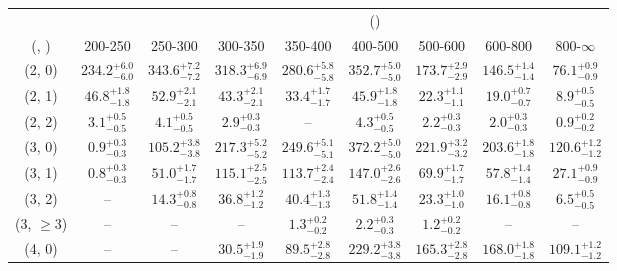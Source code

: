 \begin{table}[h!]
\tiny
\centering
{}
\begin{tabular}
{ccccccccc}
	\hline\hline
&	& \multicolumn{8}{c}{\scalht (\gev)} \\ 
	 (\njet,  \nb) & 200-250 & 250-300 & 300-350 & 350-400 & 400-500 & 500-600 & 600-800 & 800-$\infty$ \\ [0.8ex] 
\hline
	(2, 0) & $234.2^{+ 6.0 }_{- 6.0 }$ & $343.6^{+ 7.2 }_{- 7.2 }$ & $318.3^{+ 6.9 }_{- 6.9 }$ & $280.6^{+ 5.8 }_{- 5.8 }$ & $352.7^{+ 5.0 }_{- 5.0 }$ & $173.7^{+ 2.9 }_{- 2.9 }$ & $146.5^{+ 1.4 }_{- 1.4 }$ & $76.1^{+ 0.9 }_{- 0.9 }$ \\[0.5ex] 
	(2, 1) & $46.8^{+ 1.8 }_{- 1.8 }$ & $52.9^{+ 2.1 }_{- 2.1 }$ & $43.3^{+ 2.1 }_{- 2.1 }$ & $33.4^{+ 1.7 }_{- 1.7 }$ & $45.9^{+ 1.8 }_{- 1.8 }$ & $22.3^{+ 1.1 }_{- 1.1 }$ & $19.0^{+ 0.7 }_{- 0.7 }$ & $8.9^{+ 0.5 }_{- 0.5 }$ \\[0.5ex] 
	(2, 2) & $3.1^{+ 0.5 }_{- 0.5 }$ & $4.1^{+ 0.5 }_{- 0.5 }$ & $2.9^{+ 0.3 }_{- 0.3 }$ & -- & $4.3^{+ 0.5 }_{- 0.5 }$ & $2.2^{+ 0.3 }_{- 0.3 }$ & $2.0^{+ 0.3 }_{- 0.3 }$ & $0.9^{+ 0.2 }_{- 0.2 }$ \\[0.5ex] 
	(3, 0) & $0.9^{+ 0.3 }_{- 0.3 }$ & $105.2^{+ 3.8 }_{- 3.8 }$ & $217.3^{+ 5.2 }_{- 5.2 }$ & $249.6^{+ 5.1 }_{- 5.1 }$ & $372.2^{+ 5.0 }_{- 5.0 }$ & $221.9^{+ 3.2 }_{- 3.2 }$ & $203.6^{+ 1.8 }_{- 1.8 }$ & $120.6^{+ 1.2 }_{- 1.2 }$ \\[0.5ex] 
	(3, 1) & $0.8^{+ 0.3 }_{- 0.3 }$ & $51.0^{+ 1.7 }_{- 1.7 }$ & $115.1^{+ 2.5 }_{- 2.5 }$ & $113.7^{+ 2.4 }_{- 2.4 }$ & $147.0^{+ 2.6 }_{- 2.6 }$ & $69.9^{+ 1.7 }_{- 1.7 }$ & $57.8^{+ 1.4 }_{- 1.4 }$ & $27.1^{+ 0.9 }_{- 0.9 }$ \\[0.5ex] 
	(3, 2) & -- & $14.3^{+ 0.8 }_{- 0.8 }$ & $36.8^{+ 1.2 }_{- 1.2 }$ & $40.4^{+ 1.3 }_{- 1.3 }$ & $51.8^{+ 1.4 }_{- 1.4 }$ & $23.3^{+ 1.0 }_{- 1.0 }$ & $16.1^{+ 0.8 }_{- 0.8 }$ & $6.5^{+ 0.5 }_{- 0.5 }$ \\[0.5ex] 
	(3, $\ge3$) & -- & -- & -- & $1.3^{+ 0.2 }_{- 0.2 }$ & $2.2^{+ 0.3 }_{- 0.3 }$ & $1.2^{+ 0.2 }_{- 0.2 }$ & -- & -- \\[0.5ex] 
	(4, 0) & -- & -- & $30.5^{+ 1.9 }_{- 1.9 }$ & $89.5^{+ 2.8 }_{- 2.8 }$ & $229.2^{+ 3.8 }_{- 3.8 }$ & $165.3^{+ 2.8 }_{- 2.8 }$ & $168.0^{+ 1.8 }_{- 1.8 }$ & $109.1^{+ 1.2 }_{- 1.2 }$ \\[0.5ex] 

\end{tabular}
\end{table}
